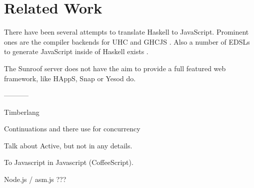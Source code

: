  
\section{Related Work}



There have been several attempts to translate Haskell to JavaScript.
Prominent ones are the compiler backends for 
UHC \cite{Stutterheim:12:ImprovingUHCJavaScriptBackend} and 
GHCJS \cite{Nazarov:GHCJS}. Also 
a number of EDSLs to generate JavaScript inside of Haskell 
exists
.


The Sunroof server does not have the aim to provide a full featured 
web framework, like HAppS, Snap or Yesod do.


-----------

Timberlang

Continuations and there use for concurrency

Talk about Active, but not in any details.

To Javascript in Javascript (CoffeeScript).


Node.js / asm.js ???





